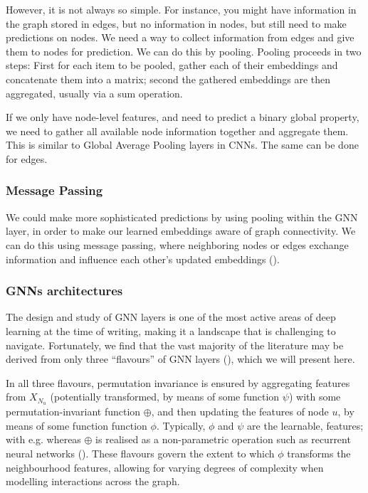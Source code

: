 \documentclass[binding=0.6cm]{sapthesis}
\newcommand{\mycite}[1]{(\cite{#1})}
\begin{document}
However, it is not always so simple. For instance, you might have information in the graph stored in edges, but no information in nodes, but still need to make predictions on nodes. We need a way to collect information from edges and give them to nodes for prediction. We can do this by pooling. Pooling proceeds in two steps: First for each item to be pooled, gather each of their embeddings and concatenate them into a matrix; second the gathered embeddings are then aggregated, usually via a sum operation.

If we only have node-level features, and need to predict a binary global property, we need to gather all available node information together and aggregate them. This is similar to Global Average Pooling layers in CNNs. The same can be done for edges.

\subsubsection{Message Passing}
\label{sec:bg.gnn.message-passing}
We could make more sophisticated predictions by using pooling within the GNN layer, in order to make our learned embeddings aware of graph connectivity. We can do this using message passing, where neighboring nodes or edges exchange information and influence each other’s updated embeddings \mycite{gilmer2017-message-passing}.


\subsubsection{GNNs architectures}
\label{sec:bg.gnn.gnn-archs}
The design and study of GNN layers is one of the most active areas of deep learning at the time of writing, making it a landscape that is challenging to navigate. Fortunately, we find that the vast majority of the literature may be derived from only three “flavours” of GNN layers \mycite{bronstein2021geometric}, which we will present here.

In all three flavours, permutation invariance is ensured by aggregating features from $X_{N_u}$ (potentially transformed, by means of some function $\psi$) with some permutation-invariant function $\oplus$, and then updating the features of node $u$, by means of some function function $\phi$. Typically, $\phi$ and $\psi$ are the learnable, features; with e.g. whereas $\oplus$ is realised as a non-parametric operation such as recurrent neural networks (\cite{murphy2019janossy}). These flavours govern the extent to which $\phi$ transforms the neighbourhood features, allowing for varying degrees of complexity when modelling interactions across the graph.
\end{document}
